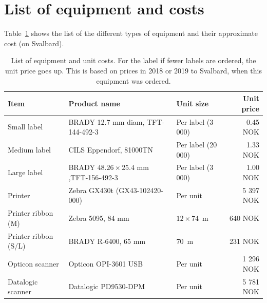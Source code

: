 \documentclass[a4paper,english, 11pt]{article}
\begin{document}

\section{List of equipment and costs} %
\label{sec:Costs}
Table~\ref{tab:costs} shows the list of the different types of equipment and their approximate cost (on Svalbard). 
\begin{table}[htb]
    \caption{\label{tab:costs}List of equipment and unit costs. For the label if fewer labels are ordered, the unit price goes up. This is based on prices in 2018 or 2019 to Svalbard, when this equipment was ordered.}
    \begin{tabular}{lllr}
        \hline
        \textbf{Item} & \textbf{Product name} & \textbf{Unit size} & \textbf{Unit price} \\ \hline
        Small label     & BRADY 12.7 mm diam, TFT-144-492-3  & Per label  (3 000)   & 0.45 NOK  \\ 
        Medium label    & CILS Eppendorf, 81000TN & Per label  (20 000)   & 1.33 NOK  \\ 
        Large label     & BRADY $48.26\times 25.4$ mm ,TFT-156-492-3      & Per label  (3 000)   & 1.00 NOK  \\ 
        Printer         & Zebra GX430t (GX43-102420-000)            & Per unit              & 5 397 NOK  \\ 
        Printer ribbon (M)  & Zebra 5095, 84 mm &     $ 12\times74$~m         & 640  NOK   \\ 
        Printer ribbon (S/L)  & BRADY R-6400, 65 mm &     $ 70$~m         & 231  NOK   \\ 
        Opticon scanner & Opticon OPI-3601 USB    & Per unit              & 1 296 NOK  \\ 
        Datalogic scanner & Datalogic PD9530-DPM  & Per unit              & 5 781 NOK  \\ 
        \hline
    \end{tabular}
\end{table}


\end{document}
